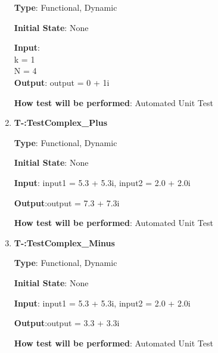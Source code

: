 \documentclass[12pt, titlepage]{article}
\newcounter{tnum}
\begin{document}
\begin{enumerate}
\textbf {Type}: Functional, Dynamic
					
					
\textbf {Initial State}: None
					
\textbf {Input}:\\
k = 1\\
N = 4	\\				
\textbf {Output}:  output = 0 + 1i
					
\textbf {How test will be performed}: Automated Unit Test


\item{\textbf{T-\thetnum:TestComplex\_Plus}}

\textbf {Type}: Functional, Dynamic
					
\textbf {Initial State}: None
					
\textbf {Input}: input1 = 5.3 + 5.3i, input2 = 2.0 + 2.0i
					
\textbf {Output}:output = 7.3 + 7.3i
					
\textbf {How test will be performed}:  Automated Unit Test



\item{\textbf{T-\thetnum:TestComplex\_Minus}}

\textbf {Type}: Functional, Dynamic
					
\textbf {Initial State}: None
					
\textbf {Input}: input1 = 5.3 + 5.3i, input2 = 2.0 + 2.0i
					
\textbf {Output}:output = 3.3 + 3.3i
					
\textbf {How test will be performed}:  Automated Unit Test

\end{enumerate}	







\newpage
\end{document}
